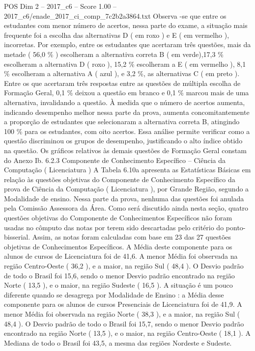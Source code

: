\begin{textsample}{POS Dim 2 – 2017\_c6 – Score 1.00 – 2017\_c6/enade\_2017\_ci\_comp\_7c2b2a3864.txt}
Observa -se que entre os estudantes com menor número de acertos, nessa parte do exame, a situação mais frequente foi a escolha das alternativas D ( em roxo ) e E ( em vermelho ), incorretas.
Por exemplo, entre os estudantes que acertaram três questões, mais da metade ( 56,0 \% ) escolheram a alternativa correta B ( em verde),17,3 \% escolheram a alternativa D ( roxo ), 15,2 \% escolheram a E ( em vermelho ), 8,1 \% escolheram a alternativa A ( azul ), e 3,2 \%, as alternativas C ( em preto ).
Entre os que acertaram três respostas entre as questões de múltipla escolha de Formação Geral, 0,1 \% deixou a questão em branco e 0,1 \% marcou mais de uma alternativa, invalidando a questão.
À medida que o número de acertos aumenta, indicando desempenho melhor nessa parte da prova, aumenta concomitantemente a proporção de estudantes que selecionaram a alternativa correta B, atingindo 100 \% para os estudantes, com oito acertos.
Essa análise permite verificar como a questão discriminou os grupos de desempenho, justificando o alto índice obtido na questão.
Os gráficos relativos às demais questões de Formação Geral constam do Anexo Ib. 6.2.3 Componente de Conhecimento Específico – Ciência da Computação ( Licenciatura ) A Tabela 6.10a apresenta as Estatísticas Básicas em relação às questões objetivas do Componente de Conhecimento Específico da prova de Ciência da Computação ( Licenciatura ), por Grande Região, segundo a Modalidade de ensino.
Nessa parte da prova, nenhuma das questões foi anulada pela Comissão Assessora da Área.
Como será discutido ainda nesta seção, quatro questões objetivas do Componente de Conhecimentos Específicos não foram usadas no cômputo das notas por terem sido descartadas pelo critério do ponto-bisserial.
Assim, as notas foram calculadas com base em 23 das 27 questões objetivas de Conhecimentos Específicos.
A Média deste componente para os alunos de cursos de Licenciatura foi de 41,6.
A menor Média foi observada na região Centro-Oeste ( 36,2 ), e a maior, na região Sul ( 48,4 ).
O Desvio padrão de todo o Brasil foi 15,6, sendo o menor Desvio padrão encontrado na região Norte ( 13,5 ), e o maior, na região Sudeste ( 16,5 ).
A situação é um pouco diferente quando se desagrega por Modalidade de Ensino : a Média desse componente para os alunos de cursos Presenciais de Licenciatura foi de 41,9.
A menor Média foi observada na região Norte ( 38,3 ), e a maior, na região Sul ( 48,4 ).
O Desvio padrão de todo o Brasil foi 15,7, sendo o menor Desvio padrão encontrado na região Norte ( 13,5 ), e o maior, na região Centro-Oeste ( 18,1 ).
A Mediana de todo o Brasil foi 43,5, a mesma das regiões Nordeste e Sudeste.

\end{textsample}
